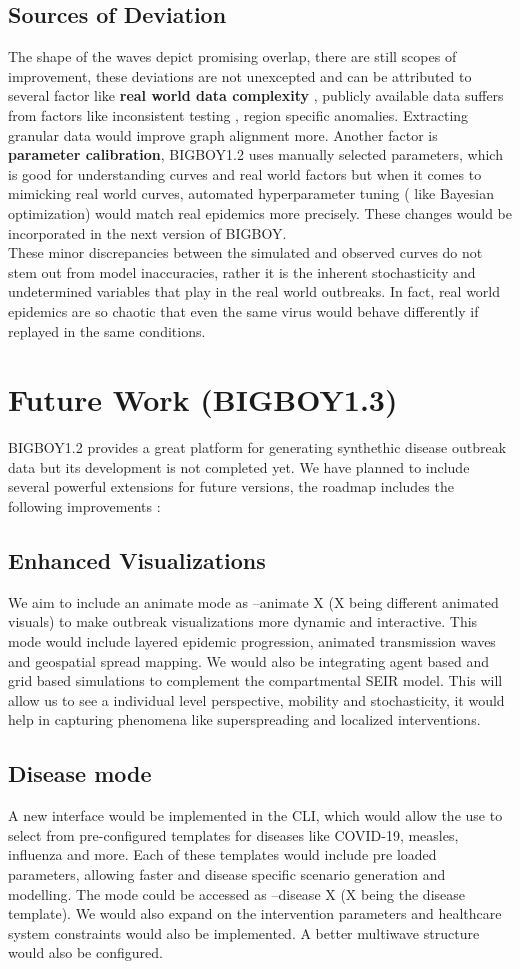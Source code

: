 \documentclass[11pt,a4paper]{article}
\theoremstyle{remark}\newtheorem{remark}{Remark}
\begin{document}
\subsection{Sources of Deviation}
The shape of the waves depict promising overlap, there are still scopes of improvement, these deviations are not unexcepted and can be attributed to several factor like \textbf{real world data complexity} , publicly available data suffers from factors like inconsistent testing , region specific anomalies. Extracting granular data would improve graph alignment more. Another factor is \textbf{parameter calibration}, BIGBOY1.2 uses manually selected parameters, which is good for understanding curves and real world factors but when it comes to mimicking real world curves, automated hyperparameter tuning ( like Bayesian optimization) would match real epidemics more precisely. These changes would be incorporated in the next version of BIGBOY.\\
These minor discrepancies between the simulated and observed curves do not stem out from model inaccuracies, rather it is the inherent stochasticity and undetermined variables that play in the real world outbreaks. In fact, real world epidemics are so chaotic that even the same virus would behave differently if replayed in the same conditions. 

\section{Future Work (BIGBOY1.3)}
BIGBOY1.2 provides a great platform for generating synthethic disease outbreak data but its development is not completed yet. We have planned to include several powerful extensions for future versions, the roadmap includes the following improvements : 
\subsection{Enhanced Visualizations}
We aim to include an animate mode as --animate X (X being different animated visuals) to make outbreak visualizations more dynamic and interactive. This mode would include layered epidemic progression, animated transmission waves and geospatial spread mapping. We would also be integrating agent based and grid based simulations to complement the compartmental SEIR model. This will allow us to see a individual level perspective,  mobility and stochasticity, it would help in capturing phenomena like superspreading and localized interventions.
\subsection{Disease mode}
A new interface would be implemented in the CLI, which would allow the use to select from pre-configured templates for diseases like COVID-19, measles, influenza and more. Each of these templates would include pre loaded parameters, allowing faster and disease specific scenario generation and modelling. The mode could be accessed as --disease X (X being the disease template). We would also expand on the intervention parameters and healthcare system constraints would also be implemented. A better multiwave structure would also be configured.
\end{document}
